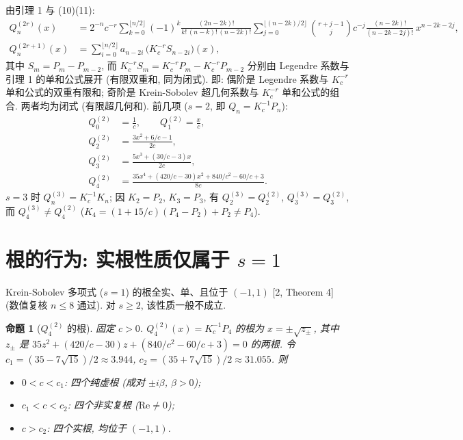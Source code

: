 \documentclass[UTF8]{ctexart}
\newtheorem{proposition}[theorem]{命题}
\begin{document}
由引理 1 与 (10)(11):
\begin{align}
	Q_n^{(2r)}(x) &= 2^{-n} c^{-r} \sum_{k=0}^{\lfloor n/2 \rfloor} (-1)^k
		\frac{(2n-2k)!}{k!\,(n-k)!\,(n-2k)!}
		\sum_{j=0}^{\lfloor (n-2k)/2 \rfloor}
		\binom{r+j-1}{j} c^{-j}
		\frac{(n-2k)!}{(n-2k-2j)!}\, x^{n-2k-2j}, \\
	Q_n^{(2r+1)}(x) &= \sum_{i=0}^{\lfloor n/2 \rfloor} a_{n-2i}\,
		\bigl( K_c^{-r} S_{n-2i} \bigr)(x),
\end{align}
其中 $S_m = P_m - P_{m-2}$, 而 $K_c^{-r}S_m = K_c^{-r}P_m - K_c^{-r}P_{m-2}$
分别由 Legendre 系数与引理 1 的单和公式展开 (有限双重和, 同为闭式).
即: 偶阶是 Legendre 系数与 $K_c^{-r}$ 单和公式的双重有限和; 奇阶是
Krein-Sobolev 超几何系数与 $K_c^{-r}$ 单和公式的组合. 两者均为闭式
(有限超几何和). 前几项 ($s=2$, 即 $Q_n = K_c^{-1}P_n$):
\begin{align}
	Q_0^{(2)} &= \frac{1}{c}, \qquad Q_1^{(2)} = \frac{x}{c}, \\
	Q_2^{(2)} &= \frac{3x^2 + 6/c - 1}{2c}, \\
	Q_3^{(2)} &= \frac{5x^3 + (30/c - 3)x}{2c}, \\
	Q_4^{(2)} &= \frac{35x^4 + (420/c - 30)x^2 + 840/c^2 - 60/c + 3}{8c}.
\end{align}
$s=3$ 时 $Q_n^{(3)} = K_c^{-1}K_n$; 因 $K_2 = P_2$, $K_3 = P_3$, 有
$Q_2^{(3)} = Q_2^{(2)}$, $Q_3^{(3)} = Q_3^{(2)}$, 而 $Q_4^{(3)} \neq Q_4^{(2)}$
($K_4 = (1 + 15/c)(P_4 - P_2) + P_2 \neq P_4$).

\section{根的行为: 实根性质仅属于 \texorpdfstring{$s=1$}{s=1}}

Krein-Sobolev 多项式 ($s=1$) 的根全实、单、且位于 $(-1,1)$ [2, Theorem 4]
(数值复核 $n \leq 8$ 通过). 对 $s \geq 2$, 该性质一般不成立.

\begin{proposition}[$Q_4^{(2)}$ 的根]
	固定 $c > 0$. $Q_4^{(2)}(x) = K_c^{-1}P_4$ 的根为
	$x = \pm\sqrt{z_\pm}$, 其中 $z_\pm$ 是 $35z^2 + (420/c - 30)z
	+ (840/c^2 - 60/c + 3) = 0$ 的两根. 令
	$c_1 = (35 - 7\sqrt{15})/2 \approx 3.944$, $c_2 = (35 + 7\sqrt{15})/2
	\approx 31.055$. 则
	\begin{itemize}
		\item $0 < c < c_1$: 四个纯虚根 (成对 $\pm i\beta$, $\beta > 0$);
		\item $c_1 < c < c_2$: 四个非实复根 ($\mathrm{Re} \neq 0$);
		\item $c > c_2$: 四个实根, 均位于 $(-1,1)$.
	\end{itemize}
\end{proposition}
\end{document}

